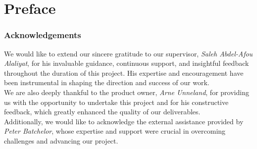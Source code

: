 \chapter*{Preface}

\subsection*{Acknowledgements}

We would like to extend our sincere gratitude to our supervisor, \textit{Saleh Abdel-Afou Alaliyat}, for his invaluable guidance, continuous support, and insightful feedback throughout the duration of this project. His expertise and encouragement have been instrumental in shaping the direction and success of our work. \\

We are also deeply thankful to the product owner, \textit{Arne Unneland}, for providing us with the opportunity to undertake this project and for his constructive feedback, which greatly enhanced the quality of our deliverables. \\

Additionally, we would like to acknowledge the external assistance provided by \textit{Peter Batchelor}, whose expertise and support were crucial in overcoming challenges and advancing our project.